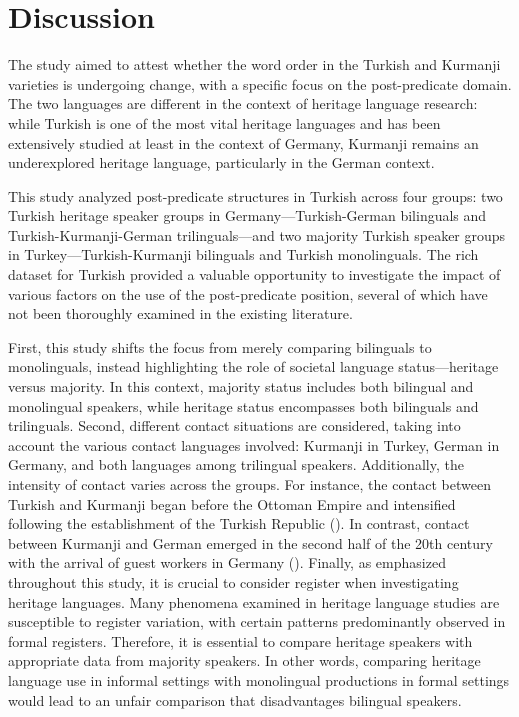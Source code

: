 \chapter{Discussion}\label{chap:key:7}

The study aimed to attest whether the word order in the Turkish and Kurmanji varieties is undergoing change, with a specific focus on the post-predicate domain. The two languages are different in the context of heritage language research: while Turkish is one of the most vital heritage languages and has been extensively studied at least in the context of Germany, Kurmanji remains an underexplored heritage language, particularly in the German context.

This study analyzed post-predicate structures in Turkish across four groups: two Turkish heritage speaker groups in Germany—Turkish-German bilinguals and Turkish-Kurmanji-German trilinguals—and two majority Turkish speaker groups in Turkey—Turkish-Kurmanji bilinguals and Turkish monolinguals. The rich dataset for Turkish provided a valuable opportunity to investigate the impact of various factors on the use of the post-predicate position, several of which have not been thoroughly examined in the existing literature.

First, this study shifts the focus from merely comparing bilinguals to monolinguals, instead highlighting the role of societal language status—heritage versus majority. In this context, majority status includes both bilingual and monolingual speakers, while heritage status encompasses both bilinguals and trilinguals. Second, different contact situations are considered, taking into account the various contact languages involved: Kurmanji in Turkey, German in Germany, and both languages among trilingual speakers. Additionally, the intensity of contact varies across the groups. For instance, the contact between Turkish and Kurmanji began before the Ottoman Empire and intensified following the establishment of the Turkish Republic (\citealt{Yagmur2001}). In contrast, contact between Kurmanji and German emerged in the second half of the 20th century with the arrival of guest workers in Germany (\citealt{GhaderiAlmstadt2023}). Finally, as emphasized throughout this study, it is crucial to consider register when investigating heritage languages. Many phenomena examined in heritage language studies are susceptible to register variation, with certain patterns predominantly observed in formal registers. Therefore, it is essential to compare heritage speakers with appropriate data from majority speakers. In other words, comparing heritage language use in informal settings with monolingual productions in formal settings would lead to an unfair comparison that disadvantages bilingual speakers.

